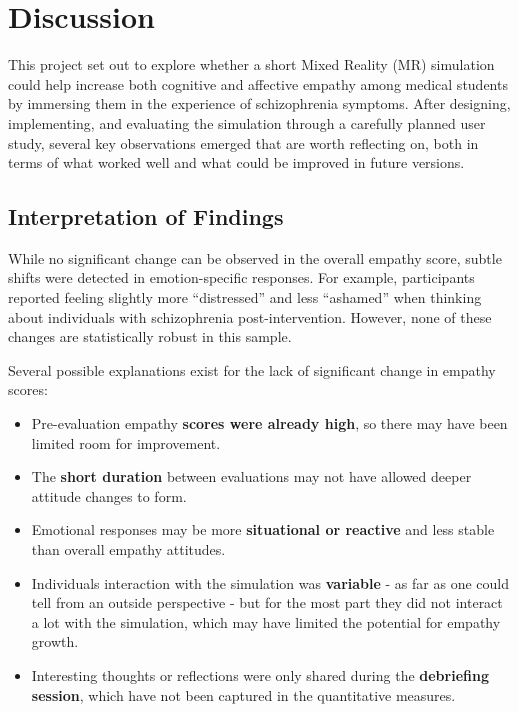 \chapter{Discussion}
\label{ch:discussion}

This project set out to explore whether a short Mixed Reality (MR) simulation could help increase both cognitive and affective empathy among medical students by immersing them in the experience of schizophrenia symptoms. After designing, implementing, and evaluating the simulation through a carefully planned user study, several key observations emerged that are worth reflecting on, both in terms of what worked well and what could be improved in future versions.

\section{Interpretation of Findings}

While no significant change can be observed in the overall empathy score, subtle shifts were detected in emotion-specific responses. For example, participants reported feeling slightly more “distressed” and less “ashamed” when thinking about individuals with schizophrenia post-intervention. However, none of these changes are statistically robust in this sample.

Several possible explanations exist for the lack of significant change in empathy scores:
\begin{itemize}
  \item Pre-evaluation empathy \textbf{scores were already high}, so there may have been limited room for improvement.
  \item The \textbf{short duration} between evaluations may not have allowed deeper attitude changes to form.
  \item Emotional responses may be more \textbf{situational or reactive} and less stable than overall empathy attitudes.
  \item Individuals interaction with the simulation was \textbf{variable} - as far as one could tell from an outside perspective - but for the most part they did not interact a lot with the simulation, which may have limited the potential for empathy growth.
  \item Interesting thoughts or reflections were only shared during the \textbf{debriefing session}, which have not been captured in the quantitative measures.
\end{itemize}

